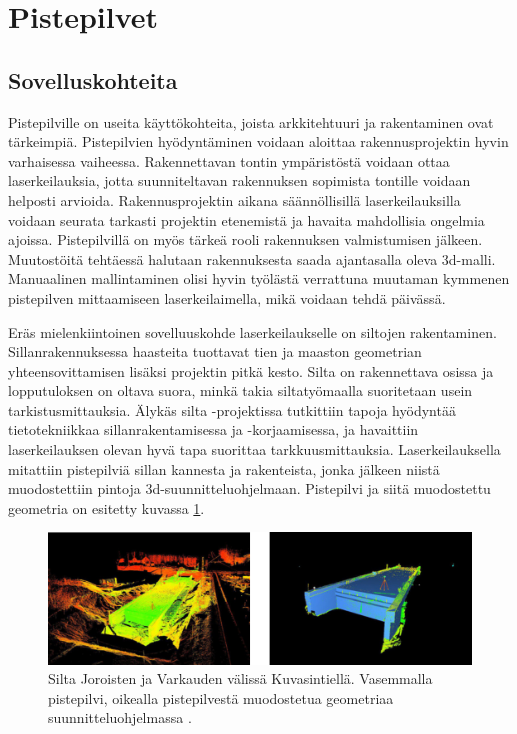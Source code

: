\section{Pistepilvet}\label{pistepilvet}

\subsection{Sovelluskohteita}

Pistepilville on useita käyttökohteita, joista arkkitehtuuri ja rakentaminen ovat tärkeimpiä. Pistepilvien hyödyntäminen voidaan aloittaa rakennusprojektin hyvin varhaisessa vaiheessa. Rakennettavan tontin ympäristöstä voidaan ottaa laserkeilauksia, jotta suunniteltavan rakennuksen sopimista tontille voidaan helposti arvioida. Rakennusprojektin aikana säännöllisillä laserkeilauksilla voidaan seurata tarkasti projektin etenemistä ja havaita mahdollisia ongelmia ajoissa. Pistepilvillä on myös tärkeä rooli rakennuksen valmistumisen jälkeen. Muutostöitä tehtäessä halutaan rakennuksesta saada ajantasalla oleva 3d-malli. Manuaalinen mallintaminen olisi hyvin työlästä verrattuna muutaman kymmenen pistepilven mittaamiseen laserkeilaimella, mikä voidaan tehdä päivässä. \cite{bim} 

Eräs mielenkiintoinen sovelluuskohde laserkeilaukselle on siltojen rakentaminen. Sillanrakennuksessa haasteita tuottavat tien ja maaston geometrian yhteensovittamisen lisäksi projektin pitkä kesto. Silta on rakennettava osissa ja lopputuloksen on oltava suora, minkä takia siltatyömaalla suoritetaan usein tarkistusmittauksia. Älykäs silta -projektissa tutkittiin tapoja hyödyntää tietotekniikkaa sillanrakentamisessa ja -korjaamisessa, ja havaittiin laserkeilauksen olevan hyvä tapa suorittaa tarkkuusmittauksia. Laserkeilauksella mitattiin pistepilviä sillan kannesta ja rakenteista, jonka jälkeen niistä muodostettiin pintoja 3d-suunnitteluohjelmaan. Pistepilvi ja siitä muodostettu geometria on esitetty kuvassa \ref{silt}. \cite{silta}   

\begin{figure}
    \centering
    \includegraphics[width=\textwidth]{img/silta.png}
    \caption{Silta Joroisten ja Varkauden välissä Kuvasintiellä. Vasemmalla pistepilvi, oikealla pistepilvestä muodostetua geometriaa suunnitteluohjelmassa \cite{silta}.}
    \label{silt}
\end{figure}


